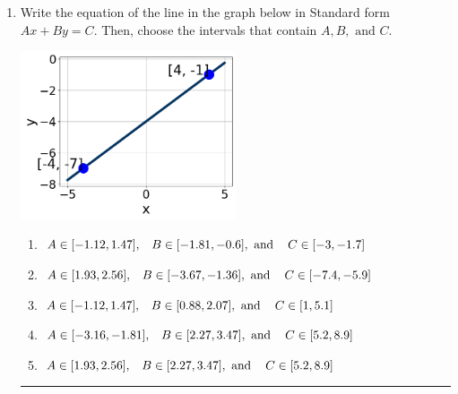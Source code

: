 \documentclass[14pt]{extbook}
\newcommand{\litem}[1]{\item#1\hspace*{-1cm}\rule{\textwidth}{0.4pt}}
\begin{document}
\begin{enumerate}
{\begin{enumerate}[label=\Alph*.]
\end{enumerate} }
\litem{
Write the equation of the line in the graph below in Standard form $Ax+By=C$. Then, choose the intervals that contain $A, B, \text{ and } C$.
\begin{center}
    \includegraphics[width=0.5\textwidth]{../Figures/linearGraphToStandardCopyB.png}
\end{center}
\begin{enumerate}[label=\Alph*.]
\item \( A \in [-1.12, 1.47], \hspace{3mm} B \in [-1.81, -0.6], \text{ and } \hspace{3mm} C \in [-3, -1.7] \)
\item \( A \in [1.93, 2.56], \hspace{3mm} B \in [-3.67, -1.36], \text{ and } \hspace{3mm} C \in [-7.4, -5.9] \)
\item \( A \in [-1.12, 1.47], \hspace{3mm} B \in [0.88, 2.07], \text{ and } \hspace{3mm} C \in [1, 5.1] \)
\item \( A \in [-3.16, -1.81], \hspace{3mm} B \in [2.27, 3.47], \text{ and } \hspace{3mm} C \in [5.2, 8.9] \)
\item \( A \in [1.93, 2.56], \hspace{3mm} B \in [2.27, 3.47], \text{ and } \hspace{3mm} C \in [5.2, 8.9] \)


\end{enumerate}}
\end{enumerate}
\end{document}
